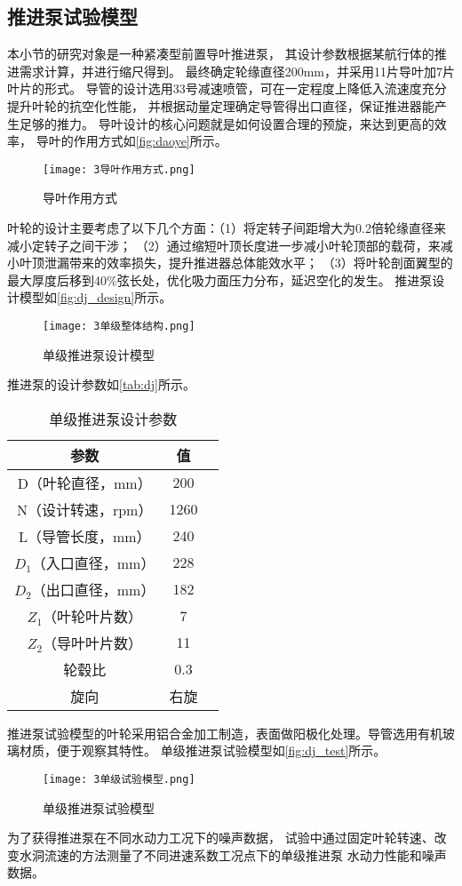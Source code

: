 \subsection{推进泵试验模型}
本小节的研究对象是一种紧凑型前置导叶推进泵，
其设计参数根据某航行体的推进需求计算，并进行缩尺得到。
最终确定轮缘直径200mm，并采用11片导叶加7片叶片的形式。
导管的设计选用33号减速喷管，可在一定程度上降低入流速度充分提升叶轮的抗空化性能，
并根据动量定理确定导管得出口直径，保证推进器能产生足够的推力。
导叶设计的核心问题就是如何设置合理的预旋，来达到更高的效率，
导叶的作用方式如\autoref{fig:daoye}所示。
\begin{figure}[htbp]
    \centering
    \texttt{[image: 3导叶作用方式.png]}
    \caption{\label{fig:daoye}导叶作用方式}
\end{figure}
叶轮的设计主要考虑了以下几个方面：（1）将定转子间距增大为0.2倍轮缘直径来减小定转子之间干涉；
（2）通过缩短叶顶长度进一步减小叶轮顶部的载荷，来减小叶顶泄漏带来的效率损失，提升推进器总体能效水平；
（3）将叶轮剖面翼型的最大厚度后移到40\%弦长处，优化吸力面压力分布，延迟空化的发生。
推进泵设计模型如\autoref{fig:dj_design}所示。
\begin{figure}[htbp]
    \centering
    \texttt{[image: 3单级整体结构.png]}
    \caption{\label{fig:dj_design}单级推进泵设计模型}
\end{figure}

推进泵的设计参数如\autoref{tab:dj}所示。
\begin{table}[htbp]
    \centering
    \caption{\label{tab:dj}单级推进泵设计参数}
    \begin{tabular}{ccc}
     \toprule
     参数&值\\
     \midrule
     D（叶轮直径，mm）&200\\
     N（设计转速，rpm）&1260\\
     L（导管长度，mm）&240\\
     $D_1$（入口直径，mm）&228\\
     $D_2$（出口直径，mm）&182\\
     $Z_1$（叶轮叶片数）&7\\
     $Z_2$（导叶叶片数）&11\\
     轮毂比&0.3\\
     旋向&右旋\\
     \bottomrule
    \end{tabular}
\end{table}
推进泵试验模型的叶轮采用铝合金加工制造，表面做阳极化处理。导管选用有机玻璃材质，便于观察其特性。
单级推进泵试验模型如\autoref{fig:dj_test}所示。
\begin{figure}[htbp]
    \centering
    \texttt{[image: 3单级试验模型.png]}
    \caption{\label{fig:dj_test}单级推进泵试验模型}
\end{figure}
为了获得推进泵在不同水动力工况下的噪声数据，
试验中通过固定叶轮转速、改变水洞流速的方法测量了不同进速系数工况点下的单级推进泵
水动力性能和噪声数据。

